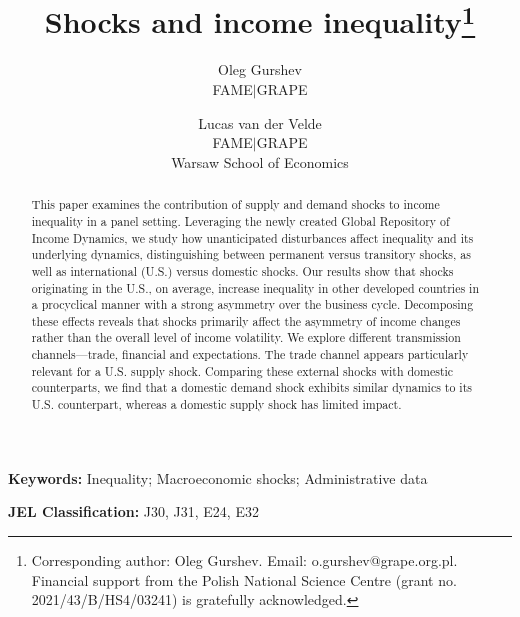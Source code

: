 \documentclass[12pt, a4paper]{article}
\title{Shocks and income inequality\thanks{Corresponding author: Oleg Gurshev. Email: o.gurshev@grape.org.pl.\\Financial support from the Polish National Science Centre (grant no. 2021/43/B/HS4/03241) is gratefully acknowledged.}}%
\author{
    Oleg Gurshev  \\ 
    \small{FAME$\mid$GRAPE} 
    \and 
    Lucas van der Velde \\ 
    \small{FAME$\mid$GRAPE} \\[-0.5em] 
    \small{Warsaw School of Economics}
}
\date{}
\begin{document}
\maketitle
\thispagestyle{empty}
\begin{abstract}
\noindent 
This paper examines the contribution of supply and demand shocks to income inequality in a panel setting. Leveraging the newly created Global Repository of Income Dynamics, we study how unanticipated disturbances affect inequality and its underlying dynamics, distinguishing between permanent versus transitory shocks, as well as international (U.S.) versus domestic shocks. Our results show that shocks originating in the U.S., on average, increase inequality in other developed countries in a procyclical manner with a strong asymmetry over the business cycle. Decomposing these effects reveals that shocks primarily affect the asymmetry of income changes rather than the overall level of income volatility. We explore different transmission channels—trade, financial and expectations. The trade channel appears particularly relevant for a U.S. supply shock. Comparing these external shocks with domestic counterparts, we find that a domestic demand shock exhibits similar dynamics to its U.S. counterpart, whereas a domestic supply shock has limited impact.
\end{abstract}

\bigskip
\hspace*{15pt}\textbf{Keywords:} Inequality; Macroeconomic shocks; Administrative data
 
\hspace*{15pt}\textbf{JEL Classification:} J30, J31, E24, E32
\clearpage

\end{document}
